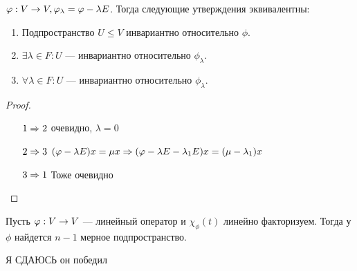 \begin{proposition}
    \(\varphi: V \rightarrow V, \varphi_\lambda = \varphi - \lambda E\). Тогда следующие утверждения эквивалентны:
    \begin{enumerate}
        \item Подпространство \(U \le V\) инвариантно относительно \(\phi\).
        \item \(\exists \lambda \in F: U\) --- инвариантно относительно \(\phi_\lambda\).
        \item \(\forall \lambda \in F: U\) --- инвариантно относительно \(\phi_\lambda\).
    \end{enumerate}
\end{proposition}
\begin{proof}\indent
    \begin{enumerate}
        \item[\(1 \Rightarrow 2\)] очевидно, \(\lambda = 0\)
        \item[\(2 \Rightarrow 3\)] \((\varphi - \lambda E)x = \mu x \Rightarrow (\varphi - \lambda E - \lambda_1 E)x = (\mu - \lambda_1) x\)
        \item[\(3 \Rightarrow 1\)] Тоже очевидно
    \end{enumerate}
\end{proof}

\begin{proposition}
    Пусть \(\varphi: V \rightarrow V\) --- линейный оператор и \(\chi_\phi(t)\) линейно факторизуем. Тогда у \(\phi\) найдется \(n - 1\) мерное подпространство.
\end{proposition}

Я СДАЮСЬ
он победил